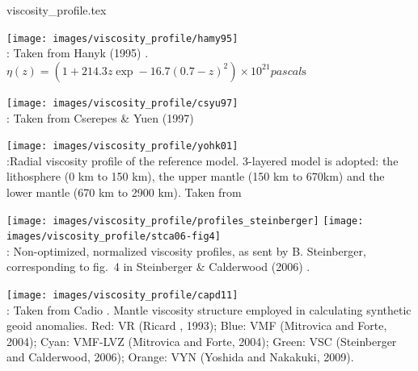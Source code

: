 \begin{flushright} {\tiny {\color{gray} viscosity\_profile.tex}} \end{flushright}


\begin{center}
\texttt{[image: images/viscosity\_profile/hamy95]}\\
{\captionfont \nineteenninetyfive: Taken from Hanyk \etal (1995) \cite{hamy95}. 
$\eta(z)=(1+214.3z\exp-16.7(0.7-z)^2)\times 10^{21}\si{pascal\second}$ }
\end{center}

\begin{center}
\texttt{[image: images/viscosity\_profile/csyu97]}\\
{\captionfont \nineteenninetyseven: Taken from Cserepes \& Yuen (1997) \cite{csyu97}} 
\end{center}

\begin{center}
\texttt{[image: images/viscosity\_profile/yohk01]}\\
{\captionfont \twothousandone:Radial viscosity profile of the reference model. 3-layered model is adopted: 
the lithosphere (0 km to 150 km), the upper mantle (150 km to 670km) 
and the lower mantle (670 km to 2900 km). Taken from \cite{yohk01}}
\end{center}


\begin{center}
\texttt{[image: images/viscosity\_profile/profiles\_steinberger]}
\texttt{[image: images/viscosity\_profile/stca06-fig4]}\\
{\captionfont \twothousandsix:
Non-optimized, normalized viscosity profiles, as sent by B. Steinberger,
corresponding to fig.~4 in Steinberger \& Calderwood (2006) \cite{stca06}.}
\end{center}


\begin{center}
\texttt{[image: images/viscosity\_profile/capd11]}\\
{\captionfont \twothousandeleven: Taken from Cadio \etal \cite{capd11}.
Mantle viscosity structure employed in calculating synthetic geoid anomalies. 
Red: VR (Ricard \etal, 1993); Blue: VMF (Mitrovica and Forte, 2004); Cyan: VMF-LVZ (Mitrovica
and Forte, 2004); Green: VSC (Steinberger and Calderwood, 2006); Orange: VYN (Yoshida and Nakakuki, 2009).}
\end{center}

